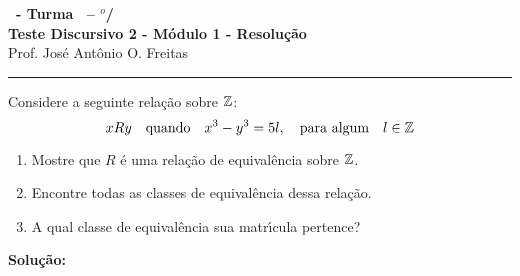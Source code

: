 \documentclass[12pt]{exam}
\begin{document}
	\begin{center}
	{\Large\bf \disciplina\ - Turma \turma\ -- \semestre$^{o}$/\ano} \\ \vspace{9pt} {\large\bf
	Teste Discursivo 2 - M\'odulo 1 - Resolu\c{c}\~ao}\\
	\vspace{9pt} Prof. Jos{\'e} Ant{\^o}nio O. Freitas
	\end{center}
	\hrule

	\vspace{.6cm}

	\questao{} Considere a seguinte rela\c{c}\~ao sobre $\mathbb{Z}$:
	\[
		x R y\quad  \mbox{quando}\quad x^3 - y^3 = 5l, \quad \mbox{para algum}\quad l \in \mathbb{Z}
	\]
	\begin{enumerate}[label={\arabic*})]
		\item Mostre que $R$ \'e uma rela\c{c}\~ao de equival\^encia sobre $\mathbb{Z}$.
		\item Encontre todas as classes de equival\^encia dessa rela\c{c}\~ao.
		\item A qual classe de equival\^encia sua matr{\'\i}cula pertence?
	\end{enumerate}

	\noindent\textbf{Solu\c{c}\~ao:}
\end{document}
